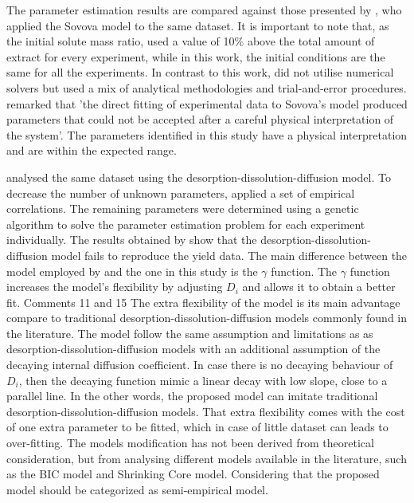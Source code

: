 \documentclass[a4paper,fleqn]{cas-dc}
\begin{document}
The parameter estimation results are compared against those presented by \citet{Povh2001}, who applied the Sovova model to the same dataset. It is important to note that, as the initial solute mass ratio, \citet{Povh2001} used  a value of 10\% above the total amount of extract for every experiment, while in this work, the initial conditions are the same for all the experiments. In contrast to this work, \citet{Povh2001} did not utilise numerical solvers but used a mix of analytical methodologies and trial-and-error procedures. \citet{Povh2001} remarked that 'the direct fitting of experimental data to Sovova's model produced parameters that could not be accepted after a careful physical interpretation of the system'. The parameters identified in this study have a physical interpretation and are within the expected range.

\citet{Rahimi2011} analysed the same dataset using the desorption-dissolution-diffusion model. To decrease the number of unknown parameters, \citet{Rahimi2011} applied a set of empirical correlations. The remaining parameters were determined using a genetic algorithm to solve the parameter estimation problem for each experiment individually. The results obtained by \citet{Rahimi2011} show that the desorption-dissolution-diffusion model fails to reproduce the yield data. The main difference between the model employed by \citet{Rahimi2011} and the one in this study is the $\gamma$ function. The $\gamma$ function increases the model's flexibility by adjusting $D_i$ and allows it to obtain a better fit.
{\color{red}Comments 11 and 15} {\color{blue}The extra flexibility of the model is its main advantage compare to traditional desorption-dissolution-diffusion models commonly found in the literature. The model follow the same assumption and limitations as as desorption-dissolution-diffusion models with an additional assumption of the decaying internal diffusion coefficient. In case there is no decaying behaviour of $D_i$, then the decaying function mimic a linear decay with low slope, close to a parallel line. In the other words, the proposed model can imitate traditional desorption-dissolution-diffusion models. That extra flexibility comes with the cost of one extra parameter to be fitted, which in case of little dataset can leads to over-fitting. The models modification has not been derived from theoretical consideration, but from analysing different models available in the literature, such as the BIC model and Shrinking Core model. Considering that the proposed model should be categorized as semi-empirical model.}
\end{document}
